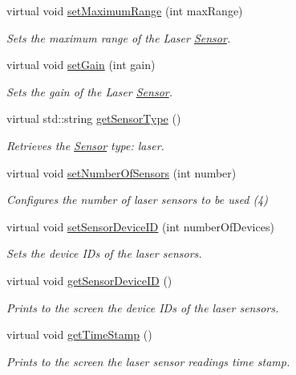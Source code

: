 \begin{DoxyCompactItemize}
virtual void \hyperlink{classLaserSensor_a04cc4baee499328b9f781edf050c092e}{set\-Maximum\-Range} (int max\-Range)
\begin{DoxyCompactList}\small\item\em Sets the maximum range of the Laser \hyperlink{classSensor}{Sensor}. \end{DoxyCompactList}\item 
virtual void \hyperlink{classLaserSensor_a79c788c37d423f350108c86666b385cb}{set\-Gain} (int gain)
\begin{DoxyCompactList}\small\item\em Sets the gain of the Laser \hyperlink{classSensor}{Sensor}. \end{DoxyCompactList}\item 
virtual std\-::string \hyperlink{classLaserSensor_aa94501358ead1126fe74e8ccaa5e83cb}{get\-Sensor\-Type} ()
\begin{DoxyCompactList}\small\item\em Retrieves the \hyperlink{classSensor}{Sensor} type\-: laser. \end{DoxyCompactList}\item 
virtual void \hyperlink{classLaserSensor_a4ce1bdb6167453f776413bcf62669562}{set\-Number\-Of\-Sensors} (int number)
\begin{DoxyCompactList}\small\item\em Configures the number of laser sensors to be used (4) \end{DoxyCompactList}\item 
virtual void \hyperlink{classLaserSensor_a186eb69518339ef4ba33e8e190a39428}{set\-Sensor\-Device\-I\-D} (int number\-Of\-Devices)
\begin{DoxyCompactList}\small\item\em Sets the device I\-Ds of the laser sensors. \end{DoxyCompactList}\item 
virtual void \hyperlink{classLaserSensor_a7b1301e42da81092ef4b16fcec3ece62}{get\-Sensor\-Device\-I\-D} ()
\begin{DoxyCompactList}\small\item\em Prints to the screen the device I\-Ds of the laser sensors. \end{DoxyCompactList}\item 
virtual void \hyperlink{classLaserSensor_a3be8d859cdab60a5e32c0855e5be928e}{get\-Time\-Stamp} ()
\begin{DoxyCompactList}\small\item\em Prints to the screen the laser sensor readings time stamp. \end{DoxyCompactList}\end{DoxyCompactItemize}


